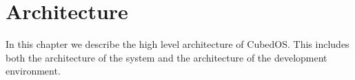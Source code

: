 
\section{Architecture}
\label{sec:development-architecture}

In this chapter we describe the high level architecture of CubedOS. This includes both the
architecture of the system and the architecture of the development environment.





